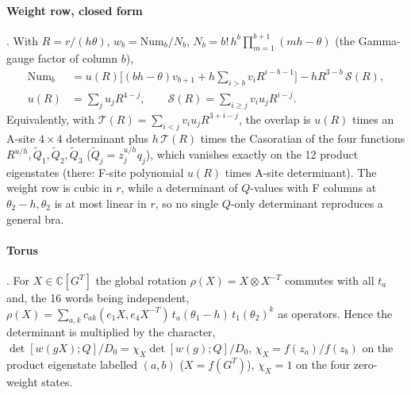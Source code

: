 \paragraph{Weight row, closed form} \ex. With $R=r/(h\theta)$, $w_b=\mathrm{Num}_b/N_b$, $N_b=b!\,h^b\prod_{m=1}^{b+1}(mh-\theta)$ (the Gamma-gauge factor of column $b$),
\begin{align}
 \mathrm{Num}_b&=u(R)\Big[(bh-\theta)v_{b+1}+h\sum_{i>b}v_iR^{i-b-1}\Big]-hR^{3-b}\,\mathcal S(R),\\
 u(R)&=\sum_ju_jR^{4-j},\qquad\mathcal S(R)=\sum_{i\ge j}v_iu_jR^{i-j}.\nonumber
\end{align}
Equivalently, with $\mathcal T(R)=\sum_{i<j}v_iu_jR^{3+i-j}$, the overlap is $u(R)$ times an A-site $4\times4$ determinant plus $h\,\mathcal T(R)$ times the Casoratian of the four functions
$R^{u/h},\tilde Q_1,\tilde Q_2,\tilde Q_3$ ($\tilde Q_j=z_j^{u/h}q_j$), which vanishes exactly on the 12 product eigenstates (there: F-site polynomial $u(R)$ times A-site determinant). The weight row is
cubic in $r$, while a determinant of $Q$-values with F columns at $\theta_2-h,\theta_2$ is at most linear in $r$, so no single $Q$-only determinant reproduces a general bra.

\paragraph{Torus} \ex. For $X\in\mathbb C[G^T]$ the global rotation $\rho(X)=X\otimes X^{-T}$ commutes with all $t_a$ and, the 16 words being independent,
$\rho(X)=\sum_{a,k}c_{ak}(e_1X,e_4X^{-T})\,t_a(\theta_1-h)\,t_1(\theta_2)^k$ as operators. Hence the determinant is multiplied by the character,
$\det[w(gX);Q]/D_0=\chi_X\det[w(g);Q]/D_0$, $\chi_X=f(z_a)/f(z_b)$ on the product eigenstate labelled $(a,b)$ ($X=f(G^T)$), $\chi_X=1$ on the four zero-weight states.

